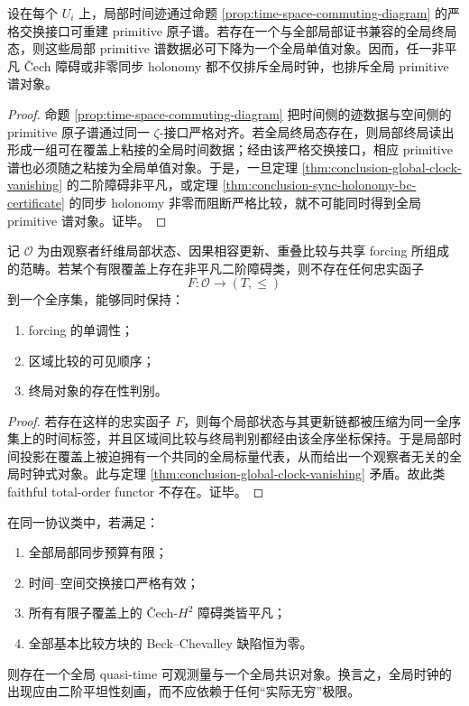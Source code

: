 \begin{proposition}\label{prop:conclusion-global-terminal-state-forces-global-primitive-spectrum}
设在每个 \(U_i\) 上，局部时间迹通过命题 \ref{prop:time-space-commuting-diagram} 的严格交换接口可重建 primitive 原子谱。若存在一个与全部局部证书兼容的全局终局态，则这些局部 primitive 谱数据必可下降为一个全局单值对象。因而，任一非平凡 Čech 障碍或非零同步 holonomy 都不仅排斥全局时钟，也排斥全局 primitive 谱对象。
\end{proposition}
\begin{proof}
命题 \ref{prop:time-space-commuting-diagram} 把时间侧的迹数据与空间侧的 primitive 原子谱通过同一 \(\zeta\)-接口严格对齐。若全局终局态存在，则局部终局读出形成一组可在覆盖上粘接的全局时间数据；经由该严格交换接口，相应 primitive 谱也必须随之粘接为全局单值对象。于是，一旦定理 \ref{thm:conclusion-global-clock-vanishing} 的二阶障碍非平凡，或定理 \ref{thm:conclusion-sync-holonomy-bc-certificate} 的同步 holonomy 非零而阻断严格比较，就不可能同时得到全局 primitive 谱对象。证毕。
\end{proof}

\begin{theorem}[单一总序时间函子的不可忠实化]\label{thm:conclusion-no-faithful-total-order-time-functor}
记 \(\mathcal O\) 为由观察者纤维局部状态、因果相容更新、重叠比较与共享 forcing 所组成的范畴。若某个有限覆盖上存在非平凡二阶障碍类，则不存在任何忠实函子
\[
F:\mathcal O\longrightarrow (T,\le)
\]
到一个全序集，能够同时保持：
\begin{enumerate}
  \item forcing 的单调性；
  \item 区域比较的可见顺序；
  \item 终局对象的存在性判别。
\end{enumerate}
\end{theorem}
\begin{proof}
若存在这样的忠实函子 \(F\)，则每个局部状态与其更新链都被压缩为同一全序集上的时间标签，并且区域间比较与终局判别都经由该全序坐标保持。于是局部时间投影在覆盖上被迫拥有一个共同的全局标量代表，从而给出一个观察者无关的全局时钟式对象。此与定理 \ref{thm:conclusion-global-clock-vanishing} 矛盾。故此类 faithful total-order functor 不存在。证毕。
\end{proof}

\begin{conjecture}[零曲率全球化]\label{conj:conclusion-zero-curvature-globalization}
在同一协议类中，若满足：
\begin{enumerate}
  \item 全部局部同步预算有限；
  \item 时间--空间交换接口严格有效；
  \item 所有有限子覆盖上的 Čech-\(H^2\) 障碍类皆平凡；
  \item 全部基本比较方块的 Beck--Chevalley 缺陷恒为零。
\end{enumerate}
则存在一个全局 quasi-time 可观测量与一个全局共识对象。换言之，全局时钟的出现应由二阶平坦性刻画，而不应依赖于任何“实际无穷”极限。
\end{conjecture}
